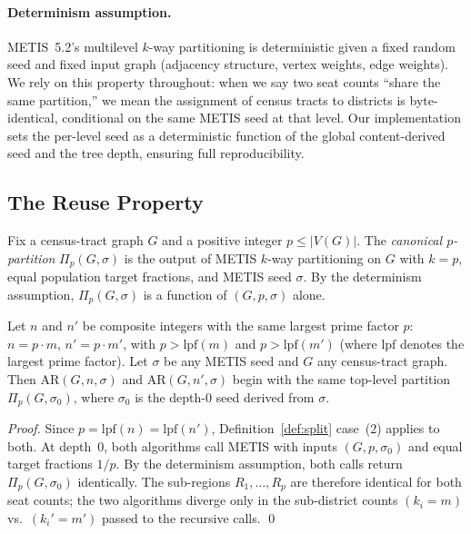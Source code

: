 \paragraph{Determinism assumption.}
METIS~5.2's multilevel $k$-way partitioning is deterministic given a fixed
random seed and fixed input graph (adjacency structure, vertex weights, edge
weights). We rely on this property throughout: when we say two seat counts
``share the same partition,'' we mean the assignment of census tracts to
districts is byte-identical, conditional on the same METIS seed at that level.
Our implementation sets the per-level seed as a deterministic function of the
global content-derived seed and the tree depth, ensuring full reproducibility.

\subsection{The Reuse Property}
\label{sec:reuse}

\begin{definition}
  Fix a census-tract graph $G$ and a positive integer $p \leq |V(G)|$. The
  \emph{canonical $p$-partition} $\Pi_p(G, \sigma)$ is the output of METIS
  $k$-way partitioning on $G$ with $k = p$, equal population target fractions,
  and METIS seed $\sigma$. By the determinism assumption, $\Pi_p(G, \sigma)$ is
  a function of $(G, p, \sigma)$ alone.
\end{definition}

\begin{theorem}[Reuse]
  \label{thm:reuse}
  Let $n$ and $n'$ be composite integers with the same largest prime factor $p$:
  $n = p \cdot m$, $n' = p \cdot m'$, with $p > \text{lpf}(m)$ and
  $p > \text{lpf}(m')$ (where $\text{lpf}$ denotes the largest prime factor).
  Let $\sigma$ be any METIS seed and $G$ any census-tract graph. Then
  $\text{AR}(G, n, \sigma)$ and $\text{AR}(G, n', \sigma)$ begin with the
  same top-level partition $\Pi_p(G, \sigma_0)$, where $\sigma_0$ is the
  depth-0 seed derived from $\sigma$.
\end{theorem}

\begin{proof}
  Since $p = \text{lpf}(n) = \text{lpf}(n')$, Definition~\ref{def:split}
  case~(2) applies to both. At depth~0, both algorithms call METIS with
  inputs $(G, p, \sigma_0)$ and equal target fractions $1/p$. By the
  determinism assumption, both calls return $\Pi_p(G, \sigma_0)$
  identically. The sub-regions $R_1, \ldots, R_p$ are therefore identical
  for both seat counts; the two algorithms diverge only in the sub-district
  counts $(k_i = m)$ vs.\ $(k_i' = m')$ passed to the recursive calls.
  \qed
\end{proof}

